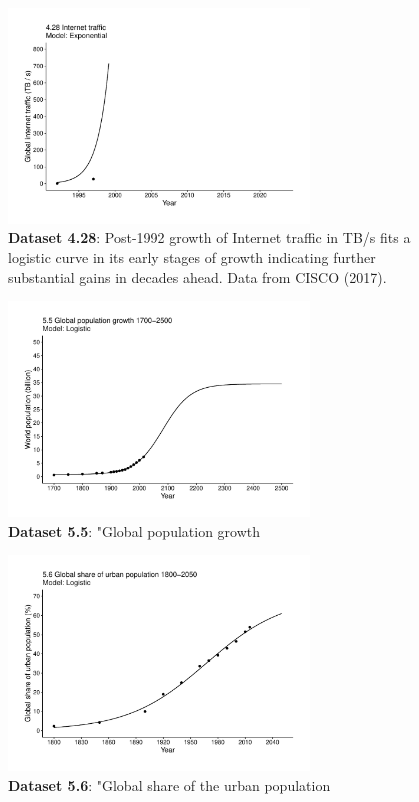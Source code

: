 \documentclass[aps,rmp,preprint,superscriptaddress,10pt,onecolumn]{article}
\begin{document}
\begin{figure}[h]
\includegraphics[width=8cm]{output/figs-ggplot/4.28.pdf}
\caption{\textbf{Dataset 4.28}: Post-1992 growth of Internet traffic in TB/s fits a logistic curve in its early stages of growth indicating further substantial gains in decades ahead. Data from CISCO (2017).}
\end{figure}
	
\begin{figure}[h]
\includegraphics[width=8cm]{output/figs-ggplot/5.5.pdf}
\caption{\textbf{Dataset 5.5}: "Global population growth}
\end{figure}
	
\begin{figure}[h]
\includegraphics[width=8cm]{output/figs-ggplot/5.6.pdf}
\caption{\textbf{Dataset 5.6}: "Global share of the urban population}
\end{figure}
	
\end{document}
